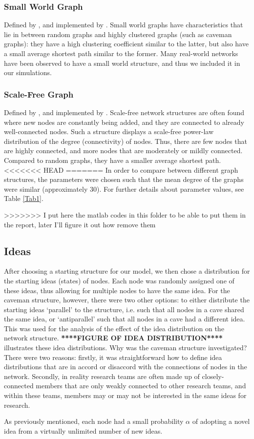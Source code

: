 \subsubsection{Small World Graph}

Defined by \citet*{WS1998}, and implemented by \citet*{BS2011}.
Small world graphs have characteristics that lie in between random graphs and highly clustered graphs (such as caveman graphs): they have a high clustering coefficient similar to the latter, but also have a small average shortest path similar to the former. Many real-world networks have been observed to have a small world structure, and thus we included it in our simulations.

\subsubsection{Scale-Free Graph}

Defined by \citet*{BA1999}, and implemented by \citet*{BS2011}.
Scale-free network structures are often found where new nodes are constantly being added, and they are connected to already well-connected nodes. Such a structure displays a scale-free power-law distribution of the degree (connectivity) of nodes. Thus, there are few nodes that are highly connected, and more nodes that are moderately or mildly connected. Compared to random graphs, they have a smaller average shortest path.
<<<<<<< HEAD
=======
In order to compare between different graph structures, the parameters were chosen such that the mean degree of the graphs were similar (approximately 30). For further details about parameter values, see Table \ref{Tab1}.


>>>>>>> I put here the matlab codes in this folder to be able to put them in the report, later I'll figure it out how remove them

\subsection{Ideas}

After choosing a starting structure for our model, we then chose a distribution for the starting ideas (states) of nodes. Each node was randomly assigned one of these ideas, thus allowing for multiple nodes to have the same idea. For the caveman structure, however, there were two other options: to either distribute the starting ideas `parallel' to the structure, i.e. such that all nodes in a cave shared the same idea, or `antiparallel' such that all nodes in a cave had a different idea. This was used for the analysis of the effect of the idea distribution on the network structure. \textbf{****FIGURE OF IDEA DISTRIBUTION****} illustrates these idea distributions. Why was the caveman structure investigated? There were two reasons: firstly, it was straightforward how to define idea distributions that are in accord or disaccord with the connections of nodes in the network. Secondly, in reality research teams are often made up of closely-connected members that are only weakly connected to other research teams, and within these teams, members may or may not be interested in the same ideas for research. 

As previously mentioned, each node had a small probability $\alpha$ of adopting a novel idea from a virtually unlimited number of new ideas.
